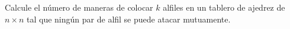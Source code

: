 \begin{statement}{25}
  Calcule el n\'umero de maneras de colocar $k$ alfiles en un tablero de ajedrez
  de $n \times n$ tal que ning\'un par de alfil se puede atacar mutuamente.
\end{statement}